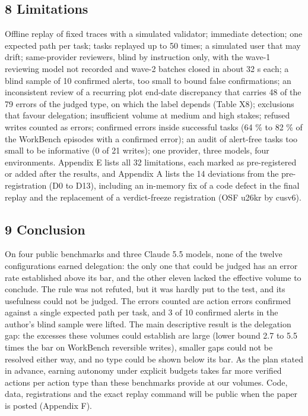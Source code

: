 \subsection{8 Limitations}\label{limitations}

Offline replay of fixed traces with a simulated validator; immediate detection; one expected path per task; tasks replayed up to 50 times; a simulated user that may drift; same-provider reviewers, blind by instruction only, with the wave-1 reviewing model not recorded and wave-2 batches closed in about 32 s each; a blind sample of 10 confirmed alerts, too small to bound false confirmations; an inconsistent review of a recurring plot end-date discrepancy that carries 48 of the 79 errors of the judged type, on which the label depends (Table X8); exclusions that favour delegation; insufficient volume at medium and high stakes; refused writes counted as errors; confirmed errors inside successful tasks (64 \% to 82 \% of the WorkBench episodes with a confirmed error); an audit of alert-free tasks too small to be informative (0 of 21 writes); one provider, three models, four environments. Appendix E lists all 32 limitations, each marked as pre-registered or added after the results, and Appendix A lists the 14 deviations from the pre-registration (D0 to D13), including an in-memory fix of a code defect in the final replay and the replacement of a verdict-freeze registration (OSF u26kr by cusv6).

\subsection{9 Conclusion}\label{conclusion}

On four public benchmarks and three Claude 5.5 models, none of the twelve configurations earned delegation: the only one that could be judged has an error rate established above its bar, and the other eleven lacked the effective volume to conclude. The rule was not refuted, but it was hardly put to the test, and its usefulness could not be judged. The errors counted are action errors confirmed against a single expected path per task, and 3 of 10 confirmed alerts in the author's blind sample were lifted. The main descriptive result is the delegation gap: the excesses these volumes could establish are large (lower bound 2.7 to 5.5 times the bar on WorkBench reversible writes), smaller gaps could not be resolved either way, and no type could be shown below its bar. As the plan stated in advance, earning autonomy under explicit budgets takes far more verified actions per action type than these benchmarks provide at our volumes. Code, data, registrations and the exact replay command will be public when the paper is posted (Appendix F).

